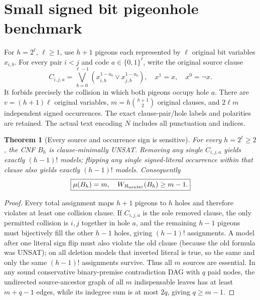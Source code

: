 \documentclass[11pt]{article}
\newtheorem{theorem}{Theorem}
\begin{document}
\section{Small signed bit pigeonhole benchmark}
For $h=2^\ell$, $\ell\ge1$, use $h+1$ pigeons each represented by $\ell$ original bit variables $x_{i,b}$. For every pair $i<j$ and code $a\in\{0,1\}^{\ell}$, write the original source clause
\[
C_{i,j,a}=\bigvee_{b=0}^{\ell-1}\left(x_{i,b}^{1-a_b}\lor x_{j,b}^{1-a_b}\right),
\quad x^1=x,\quad x^0=\neg x.
\]
It forbids precisely the collision in which both pigeons occupy hole $a$. There are $v=(h+1)\ell$ original variables, $m=h\binom{h+1}{2}$ original clauses, and $2\ell m$ independent signed occurrences. The exact clause-pair/hole labels and polarities are retained. The actual text encoding $N$ includes all punctuation and indices.
\begin{theorem}[Every source and occurrence sign is sensitive]
For every $h=2^\ell\ge2$, the CNF $B_h$ is clause-minimally UNSAT. Removing any single $C_{i,j,a}$ yields exactly $(h-1)!$ models; flipping any single signed-literal occurrence within that clause also yields exactly $(h-1)!$ models. Consequently
\[
\boxed{\mu(B_h)=m,\quad W_{R_{\rm mix341}}(B_h)\ge m-1.}
\]
\end{theorem}
\begin{proof}
Every total assignment maps $h+1$ pigeons to $h$ holes and therefore violates at least one collision clause. If $C_{i,j,a}$ is the sole removed clause, the only permitted collision is $i,j$ together in hole $a$, and the remaining $h-1$ pigeons must bijectively fill the other $h-1$ holes, giving $(h-1)!$ assignments. A model after one literal sign flip must also violate the old clause (because the old formula was UNSAT); on all deletion models that inverted literal is true, so the same and only the same $(h-1)!$ assignments survive. Thus all $m$ sources are essential. In any sound conservative binary-premise contradiction DAG with $q$ paid nodes, the undirected source-ancestor graph of all $m$ indispensable leaves has at least $m+q-1$ edges, while its indegree sum is at most $2q$, giving $q\ge m-1$.
\end{proof}
\end{document}
